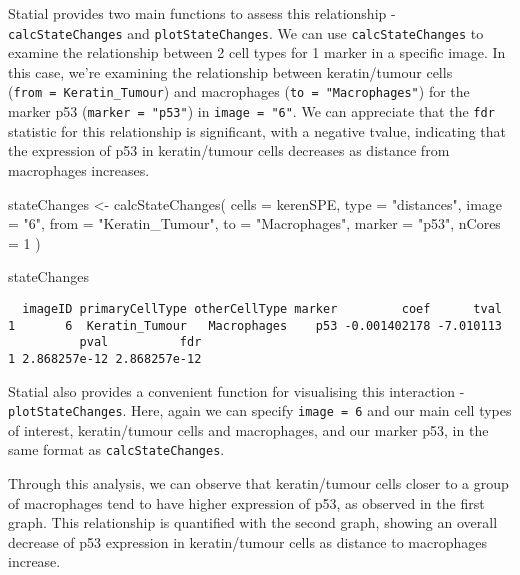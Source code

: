 \documentclass[
  letterpaper,
  DIV=11,
  numbers=noendperiod]{scrreprt}
\newenvironment{Shaded}{\begin{snugshade}}{\end{snugshade}}
\newcommand{\AttributeTok}[1]{\textcolor[rgb]{0.40,0.45,0.13}{#1}}
\newcommand{\DecValTok}[1]{\textcolor[rgb]{0.68,0.00,0.00}{#1}}
\newcommand{\FunctionTok}[1]{\textcolor[rgb]{0.28,0.35,0.67}{#1}}
\newcommand{\NormalTok}[1]{\textcolor[rgb]{0.00,0.23,0.31}{#1}}
\newcommand{\OtherTok}[1]{\textcolor[rgb]{0.00,0.23,0.31}{#1}}
\newcommand{\StringTok}[1]{\textcolor[rgb]{0.13,0.47,0.30}{#1}}
\begin{document}
Statial provides two main functions to assess this relationship -
\texttt{calcStateChanges} and \texttt{plotStateChanges}. We can use
\texttt{calcStateChanges} to examine the relationship between 2 cell
types for 1 marker in a specific image. In this case, we're examining
the relationship between keratin/tumour cells
(\texttt{from\ =\ Keratin\_Tumour}) and macrophages
(\texttt{to\ =\ "Macrophages"}) for the marker p53
(\texttt{marker\ =\ "p53"}) in \texttt{image\ =\ "6"}. We can appreciate
that the \texttt{fdr} statistic for this relationship is significant,
with a negative tvalue, indicating that the expression of p53 in
keratin/tumour cells decreases as distance from macrophages increases.

\begin{Shaded}
\begin{Highlighting}[]
\NormalTok{stateChanges }\OtherTok{\textless{}{-}} \FunctionTok{calcStateChanges}\NormalTok{(}
  \AttributeTok{cells =}\NormalTok{ kerenSPE,}
  \AttributeTok{type =} \StringTok{"distances"}\NormalTok{,}
  \AttributeTok{image =} \StringTok{"6"}\NormalTok{,}
  \AttributeTok{from =} \StringTok{"Keratin\_Tumour"}\NormalTok{,}
  \AttributeTok{to =} \StringTok{"Macrophages"}\NormalTok{,}
  \AttributeTok{marker =} \StringTok{"p53"}\NormalTok{,}
  \AttributeTok{nCores =} \DecValTok{1}
\NormalTok{)}

\NormalTok{stateChanges}
\end{Highlighting}
\end{Shaded}

\begin{verbatim}
  imageID primaryCellType otherCellType marker         coef      tval
1       6  Keratin_Tumour   Macrophages    p53 -0.001402178 -7.010113
          pval          fdr
1 2.868257e-12 2.868257e-12
\end{verbatim}

Statial also provides a convenient function for visualising this
interaction - \texttt{plotStateChanges}. Here, again we can specify
\texttt{image\ =\ 6} and our main cell types of interest, keratin/tumour
cells and macrophages, and our marker p53, in the same format as
\texttt{calcStateChanges}.

Through this analysis, we can observe that keratin/tumour cells closer
to a group of macrophages tend to have higher expression of p53, as
observed in the first graph. This relationship is quantified with the
second graph, showing an overall decrease of p53 expression in
keratin/tumour cells as distance to macrophages increase.
\end{document}
